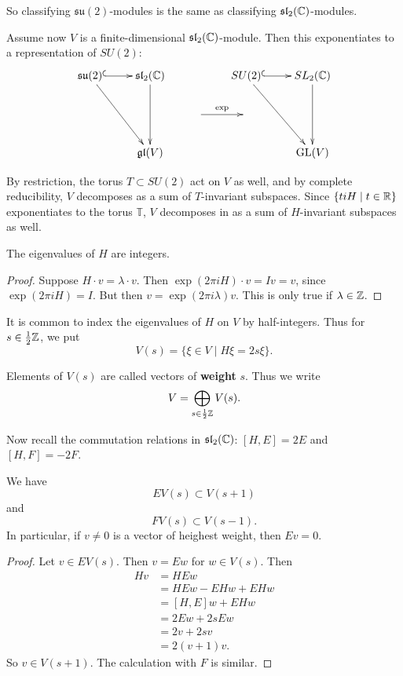 \documentclass[11pt, english]{article}
\begin{document}
So classifying $\mathfrak{su}(2)$-modules is the same as classifying $\mathfrak{sl}_2(\mathbb{C})$-modules.

Assume now $V$ is a finite-dimensional $\mathfrak{sl}_2(\mathbb{C})$-module. Then this exponentiates to a representation of $SU(2)$:
$$
\xymatrix{
\mathfrak{su}(2) \ar@{^{(}->}[r] \ar[ddr] &  \mathfrak{sl}_2(\C) \ar[dd] & & SU(2) \ar[ddr]  \ar@{^(->}[r] & SL_2(\C) \ar[dd] \\
& & \ar[r]^{\exp}   & \\
&  \mathfrak{gl}(V) && & \GL(V)
}
$$

By restriction, the torus $T \subset SU(2)$ act on $V$ as well, and by complete reducibility, $V$ decomposes as a sum of $T$-invariant subspaces. Since $\{ ti H \mid t \in \mathbb{R} \}$ exponentiates to the torus $\mathbb T$, $V$ decomposes in as a sum of $H$-invariant subspaces as well.

\begin{lemma}
  The eigenvalues of $H$ are integers.
\end{lemma}
\begin{proof}
Suppose $H \cdot v = \lambda \cdot v$. Then $\exp(2\pi i H) \cdot v = I v = v$, since $\exp( 2\pi i H) = I$. But then $v = \exp( 2 \pi i \lambda) v$. This is only true if $\lambda \in \mathbb{Z}$.
\end{proof}

It is common to index the eigenvalues of $H$ on $V$ by half-integers. Thus for $s \in \frac 12 \mathbb{Z}$, we put
$$
V(s) = \{ \xi \in V \mid H \xi = 2s \xi \}.
$$

Elements of $V(s)$ are called vectors of \textbf{weight} $s$. Thus we write
$$
V = \bigoplus_{s \in \frac 12 \mathbb{Z}} V(s).
$$

Now recall the commutation relations in $\mathfrak{sl}_2(\mathbb{C})$: $[H,E]=2E$ and $[H,F]=-2F$.

\begin{lemma}
  We have 
$$
EV(s) \subset V(s+1)
$$
and 
$$
FV(s) \subset V(s-1).
$$
In particular, if $v \neq 0$ is a vector of heighest weight, then $Ev = 0$.
\end{lemma}
\begin{proof}
Let $v \in EV(s)$. Then $v=Ew$ for $w \in V(s)$. Then
\begin{align*}
  Hv &= HEw \\
&= HEw - EHw + EHw \\
&= [H,E]w + EHw \\
&= 2Ew + 2sEw\\
&=2v+2sv \\
&=2(v+1)v.
\end{align*}
So $v \in V(s+1)$. The calculation with $F$ is similar.
\end{proof}
\end{document}
